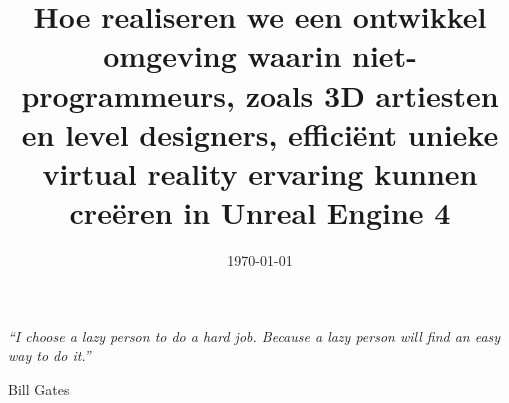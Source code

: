 \documentclass[a4paper, 11pt, oneside]{Thesis}  %
\begin{document}
\frontmatter      %

\title  {Hoe realiseren we een ontwikkel omgeving waarin niet-programmeurs, zoals 3D artiesten en level designers, efficiënt unieke virtual reality ervaring kunnen creëren in Unreal Engine 4}
\addresses  {\groupname\\\deptname\\\univname}  %
\date       {\today}
\subject    {Virtual Reality}
\keywords   {}

\maketitle


\fancyhead{}  %
\rhead{\thepage}  %
\lhead{}  %

\pagestyle{fancy}  %

\pagestyle{empty}  %

\null\vfill
\textit{``I choose a lazy person to do a hard job. Because a lazy person will find an easy way to do it.''}

\begin{flushright}
Bill Gates
\end{flushright}

\vfill\vfill\vfill\vfill\vfill\vfill\null
\clearpage  %
\end{document}

